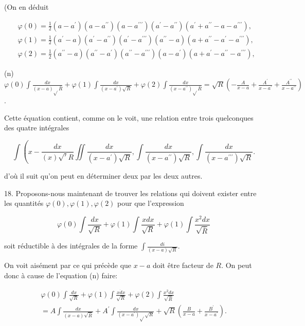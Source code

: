 \documentclass{article}
\begin{document}
(On en déduit

\[
\begin{aligned}
& \varphi(0)=\frac{1}{2}\left(a-a^{\prime}\right)\left(a-a^{\prime \prime}\right)\left(a-a^{\prime \prime \prime}\right)\left(a^{\prime}-a^{\prime \prime}\right)\left(a^{\prime}+a^{\prime \prime}-a-a^{\prime \prime \prime}\right), \\
& \varphi(1)=\frac{1}{2}\left(a^{\prime}-a\right)\left(a^{\prime}-a^{\prime \prime}\right)\left(a^{\prime}-a^{\prime \prime \prime}\right)\left(a^{\prime \prime}-a\right)\left(a+a^{\prime \prime}-a^{\prime}-a^{\prime \prime \prime}\right), \\
& \varphi(2)=\frac{1}{2}\left(a^{\prime \prime}-a\right)\left(a^{\prime \prime}-a^{\prime}\right)\left(a^{\prime \prime}-a^{\prime \prime \prime}\right)\left(a-a^{\prime}\right)\left(a+a^{\prime}-a^{\prime \prime}-a^{\prime \prime \prime}\right),
\end{aligned}
\]

(n) \(\varphi(0) \int \frac{d x}{(x-a) \sqrt{ } \bar{R}}+\varphi(1) \int \frac{d x}{\left(x-a^{\prime}\right) \sqrt{R}}+\varphi(2) \int \frac{d x}{\left(x-a^{\prime \prime}\right) \sqrt{ } \bar{R}}=\sqrt{R}\left(-\frac{A}{x-a}+\frac{A^{\prime}}{x-a^{\prime}}+\frac{A^{\prime \prime}}{x-a^{\prime \prime}}\right)\).

Cette équation contient, comme on le voit, une relation entre trois quelconques des quatre intégrales

\[
\int\left(x-\frac{d x}{(x) \sqrt{\prime} R} \iint \frac{d x}{\left(x-a^{\prime}\right) \sqrt{R}}, \int \frac{d x}{\left(x-a^{\prime \prime}\right) \sqrt{R}}, \int \frac{d x}{\left(x-a^{\prime \prime \prime}\right) \sqrt{R}} .\right.
\]

d'où il suit qu'on peut en déterminer deux par les deux autres.

18. Proposons-nous maintenant de trouver les relations qui doivent exister entre les quantités \(\varphi(0), \varphi(1), \varphi(2)\) pour que l'expression

\[
\varphi(0) \int \frac{d x}{\sqrt{R}}+\varphi(1) \int \frac{x d x}{\sqrt{R}}+\varphi(1) \int \frac{x^{2} d x}{\sqrt{\bar{R}}}
\]

soit réductible à des intégrales de la forme \(\int \frac{d i}{(x-a) \sqrt{R}}\).

On voit aisément par ce qui précède que \(x-a\) doit être facteur de \(R\). On peut donc à cause de l'equation (n) faire:

\[
\begin{gathered}
\varphi(0) \int \frac{d x}{\sqrt{R}}+\varphi(1) \int \frac{x \dot{d} x}{\sqrt{R}}+\varphi(2) \int \frac{x^{2} d x}{\sqrt{\bar{R}}} \\
=A \int \frac{d x}{(x-a) \sqrt{\bar{R}}}+A^{\prime} \int \frac{d x}{\left(x-a^{\prime}\right) \sqrt{ } \sqrt{R}}+\sqrt{R}\left(\frac{B}{x-a}+\frac{B^{\prime}}{x-a^{\prime}}\right) .
\end{gathered}
\]
\end{document}
